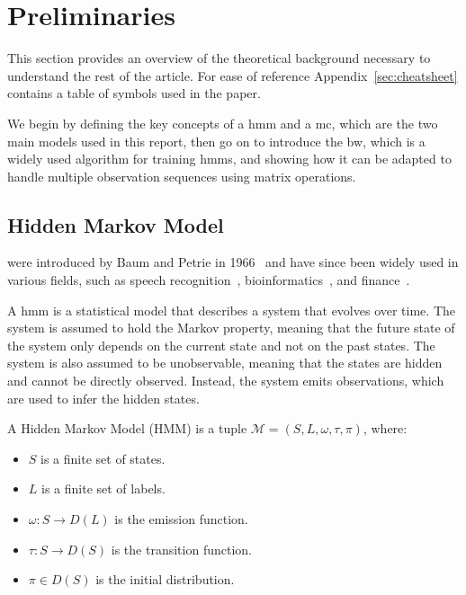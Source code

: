 \section{Preliminaries}\label{sec:preliminaries}
This section provides an overview of the theoretical background necessary to understand the rest of the article.
For ease of reference Appendix~\ref{sec:cheatsheet} contains a table of symbols used in the paper.

We begin by defining the key concepts of a \gls{hmm} and a \gls{mc}, which are the two main models used in this report, then go on to introduce the \gls{bw}, which is a widely used algorithm for training \glspl{hmm}, and showing how it can be adapted to handle multiple observation sequences using matrix operations.

\subsection{Hidden Markov Model}\label{subsec:hmm}
 were introduced by Baum and Petrie in 1966~\cite{baum1966statistical} and have since been widely used in various fields, such as speech recognition~\cite{chavan2013overview}, bioinformatics~\cite{ciocchetta2009bio}, and finance~\cite{mamon2007hidden}.

A \gls{hmm} is a statistical model that describes a system that evolves over time.
The system is assumed to hold the Markov property, meaning that the future state of the system only depends on the current state and not on the past states.
The system is also assumed to be unobservable, meaning that the states are hidden and cannot be directly observed.
Instead, the system emits observations, which are used to infer the hidden states.


\begin{definition}
    A Hidden Markov Model (HMM) is a tuple $\mathcal{M} = (S, L, \omega, \tau, \pi)$, where:
    \begin{itemize}
        \item $S$ is a finite set of states.
        \item $L$ is a finite set of labels.
        \item $\omega: S \rightarrow D(L)$ is the emission function.
        \item $\tau: S \rightarrow D(S)$ is the transition function.
        \item $\pi \in D(S)$ is the initial distribution.
    \end{itemize}
\end{definition}


